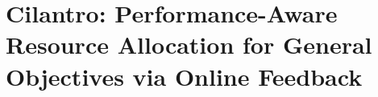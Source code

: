 \chapter{Cilantro: Performance-Aware Resource Allocation for General Objectives via Online Feedback}
\label{ch_cilantro}


\newcommand{\cilantropolicyheader}[1]{\underline{#1}}



















%
